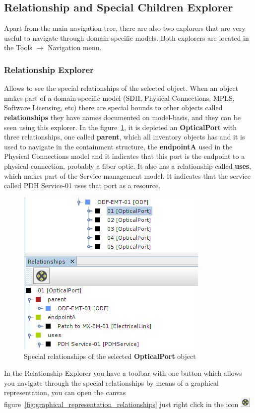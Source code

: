 \documentclass[a4paper]{article}
\begin{document}
	\subsection{Relationship and Special Children Explorer} \label{sec:extra_explorers}
	Apart from the main navigation tree, there are also two explorers that are very useful to navigate through domain-specific models. Both explorers are located in the Tools $\rightarrow$ Navigation menu.

	\subsubsection{Relationship Explorer} \label{sec:extra_explorers_relationship_explorer}
		Allows to see the special relationships of the selected object. When an object makes part of a domain-specific model (SDH, Physical Connections, MPLS, Software Licensing, etc) there are special bounds to other objects called \textbf{relationships} they have names documented on model-basis, and they can be seen using this explorer. In the figure~\ref{fig:navigation_tree_relationship_explorer}, it is depicted an \textbf{OpticalPort} with three relationships, one called \textbf{parent}, which all inventory objects has and it is used to navigate in the containment structure, the \textbf{endpointA} used in the Physical Connections model and it indicates that this port is the endpoint to a physical connection, probably a fiber optic. It also has a relationship called \textbf{uses}, which makes part of the Service management model. It indicates that the service called PDH Service-01 uses that port as a resource.
		
		\begin{figure}[h!]
			\centering
			\includegraphics[width=0.4\linewidth]{img/navigation_tree_relationship_explorer.png}
			\caption{Special relationships of the selected \textbf{OpticalPort} object}
			\label{fig:navigation_tree_relationship_explorer}
		\end{figure}
		
		In the Relationship Explorer you have a toolbar with one button which allows you navigate through the special relationships by means of a graphical representation, you can open the canvas figure~\ref{fig:graphical_representation_relationships} just right click in the icon \includegraphics[width=0.5cm]{img/icon_graphical_representation_relationships.png}		
						
\end{document}
